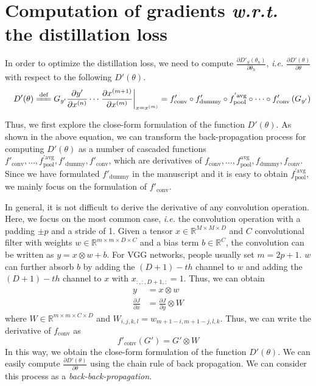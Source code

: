 \documentclass[10pt,twocolumn,letterpaper]{article}
\begin{document}
{\small


}

\newpage
\onecolumn
\appendix
\section*{Computation of gradients \emph{w.r.t.} the distillation loss}

In order to optimize the distillation loss, we need to compute $\frac{\partial D'_{S}(\theta_{h})}{\partial\theta_{h}}$, \emph{i.e.} $\frac{\partial D'(\theta)}{\partial\theta}$ with respect to the following $D'(\theta)$.
\begin{equation}
\quad D'(\theta)\xlongequal[]{\textrm{def}}G_{y'}\frac{\partial y'}{\partial x^{(n)}}\cdots\left.\frac{\partial x^{(m+1)}}{\partial x^{(m)}}\right|_{x=x^{(m)}}
=f'_{\textrm{conv}}\circ f'_{\textrm{dummy}}\circ f_{\textrm{pool}}^{'\textrm{avg}}\circ\cdots\circ f'_{\textrm{conv}}\left(G_{y'}\right)\nonumber
\end{equation}

Thus, we first explore the close-form formulation of the function $D'(\theta)$. As shown in the above equation, we can transform the back-propagation process for computing $D'(\theta)$ as a number of cascaded functions $f'_{\textrm{conv}},\ldots,f_{\textrm{pool}}^{'\textrm{avg}},f'_{\textrm{dummy}},f'_{\textrm{conv}}$, which are derivatives of $f_{\textrm{conv}},\ldots,f_{\textrm{pool}}^{\textrm{avg}},f_{\textrm{dummy}},f_{\textrm{conv}}$. Since we have formulated $f'_{\textrm{dummy}}$ in the manuscript and it is easy to obtain $f_{\textrm{pool}}^{'\textrm{avg}}$, we mainly focus on the formulation of $f'_{\textrm{conv}}$.

In general, it is not difficult to derive the derivative of any convolution operation. Here, we focus on the most common case, \emph{i.e.} the convolution operation with a padding $\pm p$ and a stride of 1. Given a tensor $x\in{\mathbb R}^{M\times M\times D}$ and $C$ convolutional filter with weights $w\in{\mathbb R}^{m\times m\times D\times C}$ and a bias term $b\in{\mathbb R}^{C}$, the convolution can be written as $y=x\otimes w+b$. For VGG networks, people usually set $m=2p+1$. $w$ can further absorb $b$ by adding the $(D+1)-th$ channel to $w$ and adding the $(D+1)-th$ channel to $x$ with $x_{:,:,D+1,:}=1$. Thus, we can obtain
\begin{equation}
\begin{split}
y&=x\otimes w\\
\frac{\partial J}{\partial x}&=\frac{\partial J}{\partial y}\otimes W
\end{split}
\nonumber
\end{equation}
where $W\in{\mathbb R}^{m\times m\times C\times D}$ and $W_{i,j,k,l}=w_{m+1-i,m+1-j,l,k}$. Thus, we can write the derivative of $f_{\textrm{conv}}$ as
\begin{equation}
f'_{\textrm{conv}}(G')=G'\otimes W
\nonumber
\end{equation}
In this way, we obtain the close-form formulation of the function $D'(\theta)$. We can easily compute $\frac{\partial D'(\theta)}{\partial\theta}$ using the chain rule of back propagation. We can consider this process as a \textit{back-back-propagation}.
\end{document}
